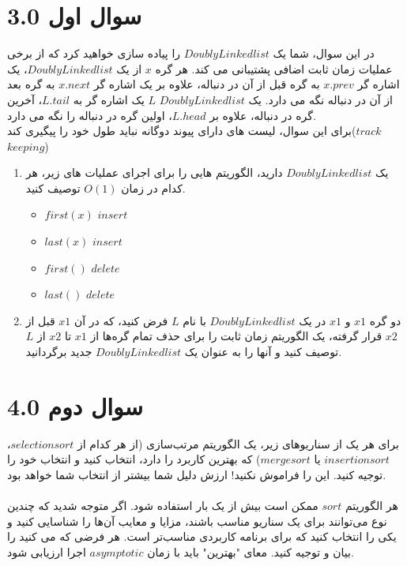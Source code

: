 \documentclass[12pt]{article}
\begin{document}
\fontsize{12pt}{14pt}\selectfont



\section{سوال اول 3.0}
در این سوال، شما یک $Doubly Linked list$ را پیاده سازی خواهید کرد که از برخی عملیات زمان ثابت اضافی پشتیبانی می کند. هر گره $x$ از یک $Doubly Linked list$، یک اشاره گر $x.prev$ به گره قبل از آن در دنباله، علاوه بر یک اشاره گر $x.next$ به گره بعد از آن در دنباله نگه می دارد. یک $Doubly Linked list$ $L$ یک اشاره گر به $L.tail$، آخرین گره در دنباله، علاوه بر $L.head$، اولین گره در دنباله را نگه می دارد.
\\

برای این سوال، لیست های دارای پیوند دوگانه نباید طول خود را پیگیری کند($track$ $keeping$)

\begin{enumerate}[label=\alph*)]
    \item یک $Doubly Linked list$ دارید، الگوریتم هایی را برای اجرای عملیات های زیر، هر کدام در زمان $O(1)$ توصیف کنید.
        \begin{itemize}
            \item  $first(x)$ $insert$ 
            \item  $last(x)$ $insert$
            \item  $first()$ $delete$
            \item  $last()$ $delete$
        \end{itemize}
    \item دو گره $x1$ و $x1$ در یک $Doubly Linked list$ با نام $L$ فرض کنید، که در آن $x1$ قبل از  $x2$ قرار گرفته، یک الگوریتم زمان ثابت را برای حذف تمام گره‌ها از $x1$ تا $x2$ از $L$ توصیف کنید و آنها را به عنوان یک $Doubly Linked list$ جدید برگردانید.
\end{enumerate}


\section{سوال دوم 4.0}
برای هر یک از سناریوهای زیر، یک الگوریتم مرتب‌سازی (از هر کدام از $selection sort$، $insertion sort$ یا $merge sort$) که بهترین کاربرد را دارد، انتخاب کنید و انتخاب خود را توجیه کنید. این را فراموش نکنید! ارزش دلیل شما بیشتر از انتخاب شما خواهد بود. 
\\
\\
هر الگوریتم $sort$ ممکن است بیش از یک بار استفاده شود. اگر متوجه شدید که چندین نوع می‌توانند برای یک سناریو مناسب باشند، مزایا و معایب آن‌ها را شناسایی کنید و یکی را انتخاب کنید که برای برنامه کاربردی مناسب‌تر است. هر فرضی که می کنید را بیان و توجیه کنید. معای "بهترین" باید با زمان $asymptotic$ اجرا ارزیابی شود.
\end{document}
